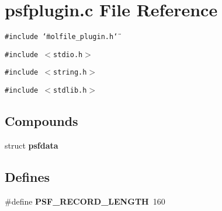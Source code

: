 \section{psfplugin.c File Reference}
\label{psfplugin_8c}
{\tt \#include \char`\"{}molfile\_\-plugin.h\char`\"{}}\par
{\tt \#include $<$stdio.h$>$}\par
{\tt \#include $<$string.h$>$}\par
{\tt \#include $<$stdlib.h$>$}\par
\subsection*{Compounds}
\begin{CompactItemize}
\item 
struct {\bf psfdata}
\end{CompactItemize}
\subsection*{Defines}
\begin{CompactItemize}
\item 
\#define {\bf PSF\_\-RECORD\_\-LENGTH}\ 160
\end{CompactItemize}
